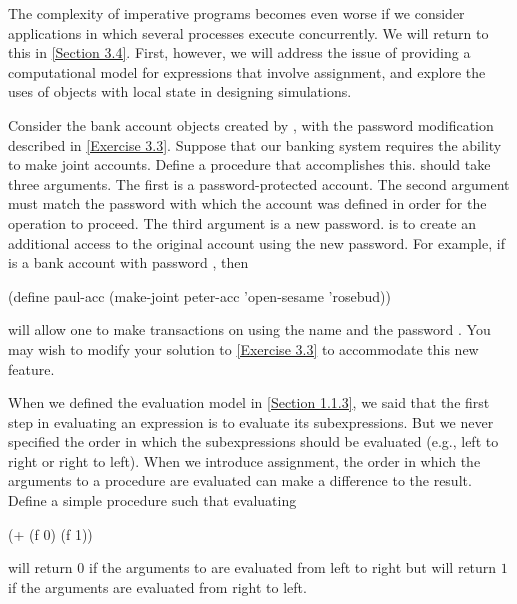 The complexity of imperative programs becomes even worse if we consider applications in which several processes execute concurrently.
We will return to this in \cref{Section 3.4}.
First, however, we will address the issue of providing a computational model for expressions that involve assignment, and explore the uses of objects with local state in designing simulations.

\begin{exercise}
	\label{Exercise 3.7}
	Consider the bank account objects created by , with the password modification described in \cref{Exercise 3.3}.
	Suppose that our banking system requires the ability to make joint accounts.
	Define a procedure  that accomplishes this.
	 should take three arguments.
	The first is a password-protected account.
	The second argument must match the password with which the account was defined in order for the  operation to proceed.
	The third argument is a new password.
	 is to create an additional access to the original account using the new password.
	For example, if  is a bank account with password , then
	\begin{scheme}
	  (define paul-acc
	    (make-joint peter-acc 'open-sesame 'rosebud))
	\end{scheme}
	will allow one to make transactions on  using the name  and the password .
	You may wish to modify your solution to \cref{Exercise 3.3} to accommodate this new feature.
\end{exercise}



\begin{exercise}
	\label{Exercise 3.8}
	When we defined the evaluation model in \cref{Section 1.1.3}, we said that the first step in evaluating an expression is to evaluate its subexpressions.
	But we never specified the order in which the subexpressions should be evaluated (e.g., left to right or right to left).
	When we introduce assignment, the order in which the arguments to a procedure are evaluated can make a difference to the result.
	Define a simple procedure  such that evaluating
	\begin{scheme}
	  (+ (f 0) (f 1))
	\end{scheme}
	will return \( 0 \) if the arguments to \code{+} are evaluated from left to right but will return \( 1 \) if the arguments are evaluated from right to left.
\end{exercise}
